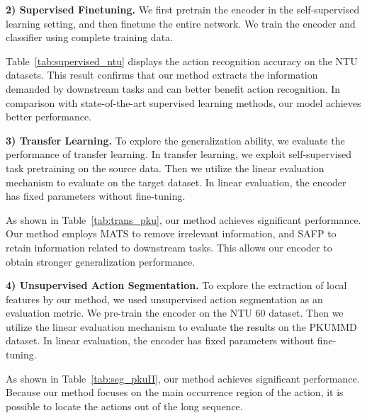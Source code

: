 \documentclass[twocolumn]{article}
\newcommand{\wh}[1]{\textcolor{black}{#1}}
\begin{document}
\noindent\textbf{2) Supervised Finetuning.}
We first pretrain the encoder  in the self-supervised learning setting, and then finetune the entire network. We train the encoder  and classifier  using complete training data.

Table~\ref{tab:supervised_ntu} displays the action recognition accuracy on the NTU datasets. This result confirms that our method extracts the information demanded by downstream tasks and can better benefit action recognition. 
In comparison with state-of-the-art supervised learning methods, our model achieves better performance.

\vspace{1mm}









\vspace{1mm}

\noindent\textbf{3) Transfer Learning.} 
To explore the generalization ability, we evaluate the performance of transfer learning. In transfer learning, we exploit self-supervised task pretraining on the source data. Then we utilize the linear evaluation mechanism to evaluate on the target dataset. In linear evaluation, the encoder  has fixed parameters without fine-tuning.

As shown in Table~\ref{tab:trans_pku}, our method achieves significant performance. Our method employs MATS to remove irrelevant information, and SAFP to retain information related to downstream tasks. This allows our encoder  to obtain stronger generalization performance.

\vspace{1mm}

\noindent\textbf{4) Unsupervised Action Segmentation.} 
To explore the extraction of local features by our method, we used unsupervised action segmentation as an evaluation metric. We pre-train the encoder  on the NTU 60 dataset. Then we utilize the linear evaluation mechanism to evaluate \wh{the results} on the PKUMMD dataset. In linear evaluation, the encoder  has fixed parameters without fine-tuning.

As shown in Table~\ref{tab:seg_pkuII}, our method achieves significant performance. Because our method focuses on the main occurrence region of the action, it is possible to locate the actions out of the long sequence.
\end{document}
